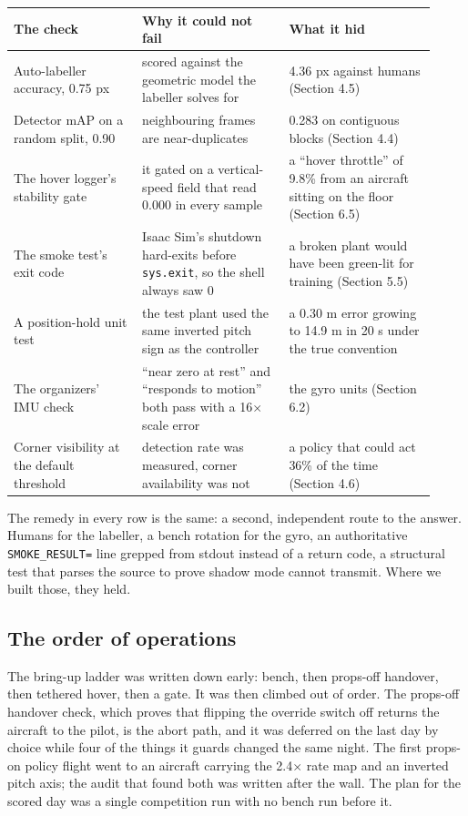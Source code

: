 \documentclass{article}
\begin{document}
\begin{table}[htbp]\centering\small
\begin{tabular}{@{}p{0.28\linewidth}p{0.32\linewidth}p{0.32\linewidth}@{}}
\toprule
The check & Why it could not fail & What it hid \\ \midrule
Auto-labeller accuracy, 0.75 px & scored against the geometric model the labeller solves for & 4.36 px against humans (Section 4.5) \\
Detector mAP on a random split, 0.90 & neighbouring frames are near-duplicates & 0.283 on contiguous blocks (Section 4.4) \\
The hover logger's stability gate & it gated on a vertical-speed field that read 0.000 in every sample & a ``hover throttle'' of 9.8\% from an aircraft sitting on the floor (Section 6.5) \\
The smoke test's exit code & Isaac Sim's shutdown hard-exits before \texttt{sys.exit}, so the shell always saw 0 & a broken plant would have been green-lit for training (Section 5.5) \\
A position-hold unit test & the test plant used the same inverted pitch sign as the controller & a 0.30 m error growing to 14.9 m in 20 s under the true convention \\
The organizers' IMU check & ``near zero at rest'' and ``responds to motion'' both pass with a 16$\times$ scale error & the gyro units (Section 6.2) \\
Corner visibility at the default threshold & detection rate was measured, corner availability was not & a policy that could act 36\% of the time (Section 4.6) \\
\bottomrule
\end{tabular}
\end{table}

The remedy in every row is the same: a second, independent route to the answer. Humans for the labeller, a bench rotation for the gyro, an authoritative \texttt{SMOKE\_RESULT=} line grepped from stdout instead of a return code, a structural test that parses the source to prove shadow mode cannot transmit. Where we built those, they held.

\subsection{The order of operations}
The bring-up ladder was written down early: bench, then props-off handover, then tethered hover, then a gate. It was then climbed out of order. The props-off handover check, which proves that flipping the override switch off returns the aircraft to the pilot, is the abort path, and it was deferred on the last day by choice while four of the things it guards changed the same night. The first props-on policy flight went to an aircraft carrying the 2.4$\times$ rate map and an inverted pitch axis; the audit that found both was written after the wall. The plan for the scored day was a single competition run with no bench run before it.
\end{document}
